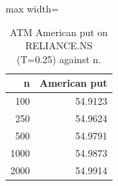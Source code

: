 \begin{table}
\centering
\small
\caption{ATM American put on RELIANCE.NS (T=0.25) against n.}
\label{tab:e11_american_convergence}
\begin{adjustbox}{max width=\textwidth}
\begin{tabular}{rr}
\toprule
n & American put \\
\midrule
100 & 54.9123 \\
250 & 54.9624 \\
500 & 54.9791 \\
1000 & 54.9873 \\
2000 & 54.9914 \\
\bottomrule
\end{tabular}
\end{adjustbox}
\end{table}
